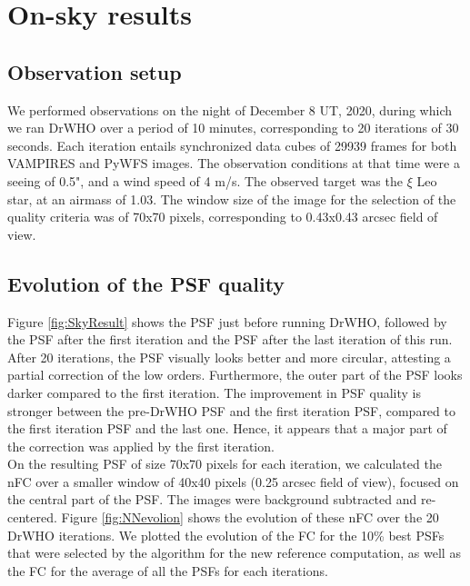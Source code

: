 \documentclass[twocolumn]{aa}
\begin{document}
\section{On-sky results}\label{sec:results}



\subsection{Observation setup}

We performed observations on the night of December 8 UT, 2020, during which we ran DrWHO over a period of 10 minutes, corresponding to 20 iterations of 30 seconds. Each iteration entails synchronized data cubes of 29939 frames for both VAMPIRES and PyWFS images. The observation conditions at that time were a seeing of 0.5", and a wind speed of 4 m/s. The observed target was the $\xi$ Leo star, at an airmass of 1.03. The window size of the image for the selection of the quality criteria was of 70x70 pixels, corresponding to 0.43x0.43 arcsec field of view. 

\subsection{Evolution of the PSF quality}
Figure \ref{fig:SkyResult} shows the PSF just before running DrWHO, followed by the PSF after the first iteration and the PSF after the last iteration of this run. After 20 iterations, the PSF visually looks better and more circular, attesting a partial correction of the low orders. Furthermore, the outer part of the PSF looks darker compared to the first iteration. The improvement in PSF quality is stronger between the pre-DrWHO PSF and the first iteration PSF, compared to the first iteration PSF and the last one. Hence, it appears that a major part of the correction was applied by the first iteration. \\
On the resulting PSF of size 70x70 pixels for each iteration, we calculated the nFC over a smaller window of 40x40 pixels (0.25 arcsec field of view), focused on the central part of the PSF. The images were background subtracted and re-centered. 
Figure \ref{fig:NNevolion} shows the evolution of these nFC over the 20 DrWHO iterations. We plotted the evolution of the FC for the 10\% best PSFs that were selected by the algorithm for the new reference computation, as well as the FC for the average of all the PSFs for each iterations. \\
\end{document}

